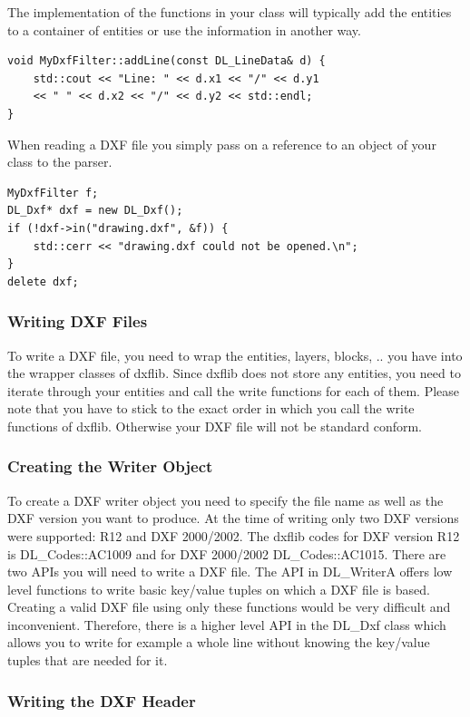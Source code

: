 The implementation of the functions in your class will typically add the entities to a container of entities or use the information in another way.

\begin{verbatim}
void MyDxfFilter::addLine(const DL_LineData& d) {
    std::cout << "Line: " << d.x1 << "/" << d.y1
    << " " << d.x2 << "/" << d.y2 << std::endl;
}
\end{verbatim}

When reading a DXF file you simply pass on a reference to an object of your class to the parser.

\begin{verbatim}
MyDxfFilter f;
DL_Dxf* dxf = new DL_Dxf();
if (!dxf->in("drawing.dxf", &f)) {
    std::cerr << "drawing.dxf could not be opened.\n";
}
delete dxf;
\end{verbatim}



\subsubsection{Writing DXF Files}
To write a DXF file, you need to wrap the entities, layers, blocks, .. you have into the wrapper classes of dxflib. Since dxflib does not store any entities, you need to iterate through your entities and call the write functions for each of them. Please note that you have to stick to the exact order in which you call the write functions of dxflib. Otherwise your DXF file will not be standard conform.

\subsubsection{Creating the Writer Object}
To create a DXF writer object you need to specify the file name as well as the DXF version you want to produce. At the time of writing only two DXF versions were supported: R12 and DXF 2000/2002. The dxflib codes for DXF version R12 is DL\_Codes::AC1009 and for DXF 2000/2002 DL\_Codes::AC1015.
There are two APIs you will need to write a DXF file. The API in DL\_WriterA offers low level functions to write basic key/value tuples on which a DXF file is based. Creating a valid DXF file using only these functions would be very difficult and inconvenient. Therefore, there is a higher level API in the DL\_Dxf class which allows you to write for example a whole line without knowing the key/value tuples that are needed for it.


\subsubsection{Writing the DXF Header}
